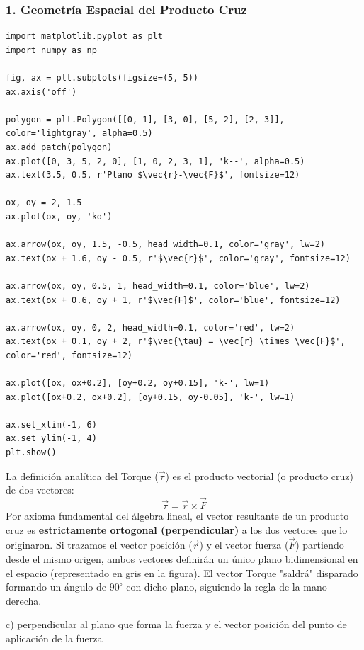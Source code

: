 \documentclass[12pt, a4paper]{article}
\begin{document}
\subsubsection*{1. Geometría Espacial del Producto Cruz}

\begin{verbatim}
import matplotlib.pyplot as plt
import numpy as np

fig, ax = plt.subplots(figsize=(5, 5))
ax.axis('off')

polygon = plt.Polygon([[0, 1], [3, 0], [5, 2], [2, 3]], color='lightgray', alpha=0.5)
ax.add_patch(polygon)
ax.plot([0, 3, 5, 2, 0], [1, 0, 2, 3, 1], 'k--', alpha=0.5)
ax.text(3.5, 0.5, r'Plano $\vec{r}-\vec{F}$', fontsize=12)

ox, oy = 2, 1.5
ax.plot(ox, oy, 'ko')

ax.arrow(ox, oy, 1.5, -0.5, head_width=0.1, color='gray', lw=2)
ax.text(ox + 1.6, oy - 0.5, r'$\vec{r}$', color='gray', fontsize=12)

ax.arrow(ox, oy, 0.5, 1, head_width=0.1, color='blue', lw=2)
ax.text(ox + 0.6, oy + 1, r'$\vec{F}$', color='blue', fontsize=12)

ax.arrow(ox, oy, 0, 2, head_width=0.1, color='red', lw=2)
ax.text(ox + 0.1, oy + 2, r'$\vec{\tau} = \vec{r} \times \vec{F}$', color='red', fontsize=12)

ax.plot([ox, ox+0.2], [oy+0.2, oy+0.15], 'k-', lw=1)
ax.plot([ox+0.2, ox+0.2], [oy+0.15, oy-0.05], 'k-', lw=1)

ax.set_xlim(-1, 6)
ax.set_ylim(-1, 4)
plt.show()
\end{verbatim}

La definición analítica del Torque ($\vec{\tau}$) es el producto vectorial (o producto cruz) de dos vectores:
$$ \vec{\tau} = \vec{r} \times \vec{F} $$
Por axioma fundamental del álgebra lineal, el vector resultante de un producto cruz es \textbf{estrictamente ortogonal (perpendicular)} a los dos vectores que lo originaron.
Si trazamos el vector posición ($\vec{r}$) y el vector fuerza ($\vec{F}$) partiendo desde el mismo origen, ambos vectores definirán un único plano bidimensional en el espacio (representado en gris en la figura). 
El vector Torque "saldrá" disparado formando un ángulo de $90^\circ$ con dicho plano, siguiendo la regla de la mano derecha.

\begin{tcolorbox}[colback=green!5!white, colframe=green!50!black, title=Respuesta Final]
\centering \Large c) perpendicular al plano que forma la fuerza y el vector posición del punto de aplicación de la fuerza
\end{tcolorbox}
\end{document}
